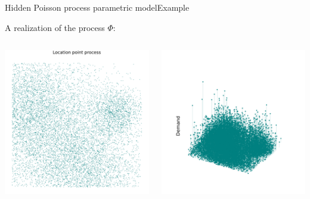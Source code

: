 \documentclass[aspectratio=169]{beamer}
\begin{document}
\begin{frame}{Hidden Poisson process parametric model}{Example}

	A realization of the process $\Phi$:

	\begin{columns}
		
		\begin{column}{0.5\textwidth}
			\centering
			\includegraphics[width=0.8\columnwidth]{figuras/location_process.pdf}
		\end{column}
		\begin{column}{0.5\textwidth}
			\centering
			\includegraphics[width=\columnwidth]{figuras/location_and_demand.pdf}			
		\end{column}

	\end{columns}


\end{frame}
\end{document}
